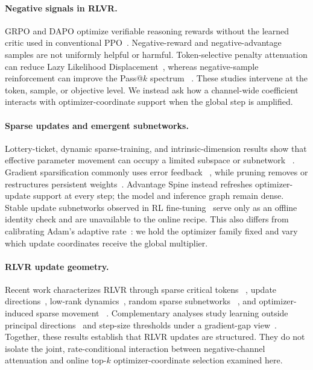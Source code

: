 \documentclass[5p,times]{elsarticle}
\begin{document}
\paragraph{Negative signals in RLVR.}
GRPO and DAPO optimize verifiable reasoning rewards without the learned critic
used in conventional PPO~\cite{schulman2017ppo,shao2024deepseekmath,yu2025dapo}.
Negative-reward and negative-advantage samples are not uniformly helpful or
harmful. Token-selective penalty attenuation can reduce
Lazy Likelihood Displacement~\cite{deng2025negativegrad}, whereas negative-sample
reinforcement can improve the Pass@$k$ spectrum
~\cite{zhu2025negativereinforcement}. These studies intervene at the token,
sample, or objective level. We instead ask how a channel-wide coefficient
interacts with optimizer-coordinate support when the global step is amplified.

\paragraph{Sparse updates and emergent subnetworks.}
Lottery-ticket, dynamic sparse-training, and intrinsic-dimension results show
that effective parameter movement can occupy a limited subspace or subnetwork
~\cite{frankle2019lottery,evci2020rigl,li2018intrinsic,aghajanyan2021intrinsic}.
Gradient sparsification commonly uses error feedback
~\cite{karimireddy2019errorfeedback,richtarik2021ef21}, while pruning removes
or restructures persistent weights~\cite{zhu2025pruningreview,
ziv2021stochasticpruning,kamelianrad2026topographical,xie2023lotteryfewshot}.
Advantage Spine instead refreshes optimizer-update support at every step; the
model and inference graph remain dense. Stable update subnetworks observed in
RL fine-tuning~\cite{mukherjee2025subnetwork} serve only as an offline identity
check and are unavailable to the online recipe. This also differs from
calibrating Adam's adaptive rate~\cite{tong2022calibratingadam}: we hold the
optimizer family fixed and vary which update coordinates receive the global
multiplier.

\paragraph{RLVR update geometry.}
Recent work characterizes RLVR through sparse critical tokens
~\cite{meng2026sparsecritical}, update directions~\cite{huang2026direction},
low-rank dynamics~\cite{ye2026lowrank}, random sparse subnetworks
~\cite{adewuyi2026multiticket}, and optimizer-induced sparse movement
~\cite{mukherjee2026needadam}. Complementary analyses study learning outside
principal directions~\cite{zhu2026threegate} and step-size thresholds under a
gradient-gap view~\cite{suk2026gradientgap}. Together, these results establish
that RLVR updates are structured. They do not isolate the joint,
rate-conditional interaction between negative-channel attenuation and online
top-$k$ optimizer-coordinate selection examined here.
\end{document}

